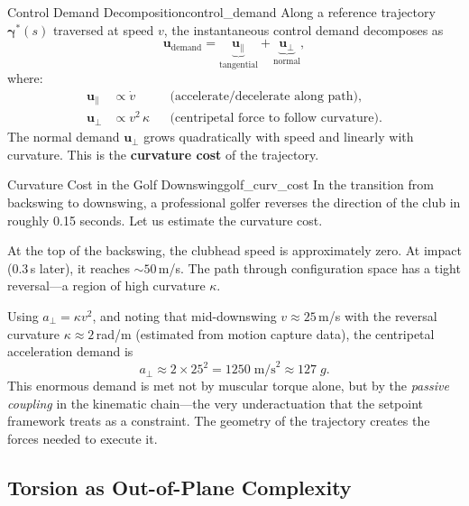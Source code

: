 \documentclass[12pt, openany]{book}
\theoremstyle{plain}
\newcommand{\control}{\bm{u}}
\newcommand{\traj}{\bm{\gamma}}
\begin{document}
\begin{definition}{Control Demand Decomposition}{control_demand}
  Along a reference trajectory $\traj^*(s)$ traversed at speed $v$, the
  instantaneous control demand decomposes as
  \begin{equation}\label{eq:control_demand}
    \control_{\text{demand}} = \underbrace{\control_\parallel}_{\text{tangential}}
    + \underbrace{\control_\perp}_{\text{normal}},
  \end{equation}
  where:
  \begin{align}
    \control_\parallel &\propto \dot{v}
      && \text{(accelerate/decelerate along path)}, \\
    \control_\perp &\propto v^2\, \kappa
      && \text{(centripetal force to follow curvature)}.
  \end{align}
  The normal demand $\control_\perp$ grows quadratically with speed and linearly
  with curvature. This is the \textbf{curvature cost} of the trajectory.
\end{definition}

\begin{example}{Curvature Cost in the Golf Downswing}{golf_curv_cost}
  In the transition from backswing to downswing, a professional golfer reverses
  the direction of the club in roughly 0.15 seconds. Let us estimate the
  curvature cost.

  At the top of the backswing, the clubhead speed is approximately zero. At
  impact (0.3\,s later), it reaches $\sim\!50$\,m/s. The path through
  configuration space has a tight reversal---a region of high curvature
  $\kappa$.

  Using $a_\perp = \kappa v^2$, and noting that mid-downswing
  $v \approx 25$\,m/s with the reversal curvature $\kappa \approx 2$\,rad/m
  (estimated from motion capture data), the centripetal acceleration demand is
  \begin{equation}
    a_\perp \approx 2 \times 25^2 = 1250\;\text{m/s}^2 \approx 127\;g.
  \end{equation}
  This enormous demand is met not by muscular torque alone, but by the
  \emph{passive coupling} in the kinematic chain---the very underactuation
  that the setpoint framework treats as a constraint. The geometry of the
  trajectory creates the forces needed to execute it.
\end{example}

\subsection{Torsion as Out-of-Plane Complexity}
\end{document}
